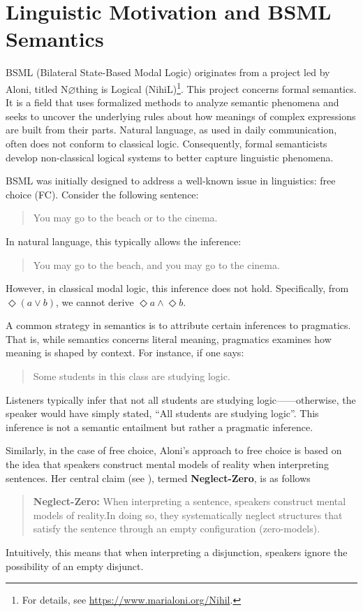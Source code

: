 \section{Linguistic Motivation and BSML Semantics}\label{Motivation}

BSML (Bilateral State-Based Modal Logic) originates from a project led by Aloni, 
titled N$\varnothing$thing is Logical (NihiL)\footnote{For details, see \url{https://www.marialoni.org/Nihil}.}. 
This project concerns formal semantics. It is a field that uses formalized methods to analyze semantic phenomena and seeks to uncover the underlying rules about how meanings of complex expressions are built from their parts.
Natural language, as used in daily communication, often does not conform to classical logic. Consequently, formal semanticists develop non-classical logical systems to better capture linguistic phenomena.

BSML was initially designed to address a well-known issue in linguistics: free choice (FC). Consider the following sentence:

\begin{quote}
    You may go to the beach or to the cinema.
\end{quote}

In natural language, this typically allows the inference:

\begin{quote}
    You may go to the beach, and you may go to the cinema.
\end{quote}

However, in classical modal logic, this inference does not hold. Specifically, from $\Diamond (a \vee b)$, we cannot derive $\Diamond a \land \Diamond b$.

A common strategy in semantics is to attribute certain inferences to pragmatics. 
That is, while semantics concerns literal meaning, pragmatics examines how meaning is shaped by context. For instance, if one says:

\begin{quote}
    Some students in this class are studying logic.
\end{quote}

Listeners typically infer that not all students are studying logic——otherwise, the speaker would have simply stated, ``All students are studying logic''.
This inference is not a semantic entailment but rather a pragmatic inference.


Similarly, in the case of free choice, 
Aloni's approach to free choice is based on the idea that speakers construct mental models of reality when interpreting sentences. 
Her central claim (see \citet{Aloni2022}), termed \textbf{Neglect-Zero}, is as follows
\begin{quote}
    \textbf{Neglect-Zero:} 
     When interpreting a sentence, speakers construct mental models of reality.In doing so, they systematically neglect structures that satisfy the sentence through an empty configuration (zero-models).
    
\end{quote}
Intuitively, this means that when interpreting a disjunction, speakers ignore the possibility of an empty disjunct.\@

